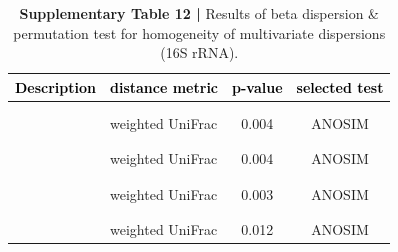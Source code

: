 \documentclass[
  10pt,
  letterpaper,
  DIV=11,
  numbers=noendperiod]{scrartcl}
\begin{document}
\begin{table}[H]

\caption{\textbf{Supplementary Table 12 |} Results of beta dispersion \& permutation test for homogeneity of multivariate dispersions (16S rRNA).}
\centering
\fontsize{8}{10}\selectfont
\begin{tabular}[t]{llcc}
\toprule
\textcolor{black}{\textbf{Description}} & \textcolor{black}{\textbf{distance metric}} & \textcolor{black}{\textbf{p-value}} & \textcolor{black}{\textbf{selected test}}\\
\midrule
\addlinespace[-0.3em]
\multicolumn{4}{l}{\textbf{}}\\
\hspace{1em}\cellcolor{gray!6}{FULL data set} & \cellcolor{gray!6}{unweighted UniFrac} & \cellcolor{gray!6}{0.013} & \cellcolor{gray!6}{ANOSIM}\\
\hspace{1em} & weighted UniFrac & 0.004 & \vphantom{1} ANOSIM\\
\addlinespace[-0.3em]
\multicolumn{4}{l}{\textbf{}}\\
\hspace{1em}\cellcolor{gray!6}{Arbitrary filter} & \cellcolor{gray!6}{unweighted UniFrac} & \cellcolor{gray!6}{0.002} & \cellcolor{gray!6}{ANOSIM}\\
\hspace{1em} & weighted UniFrac & 0.004 & ANOSIM\\
\addlinespace[-0.3em]
\multicolumn{4}{l}{\textbf{}}\\
\hspace{1em}\cellcolor{gray!6}{PERFect filter} & \cellcolor{gray!6}{unweighted UniFrac} & \cellcolor{gray!6}{0.001} & \cellcolor{gray!6}{ANOSIM}\\
\hspace{1em} & weighted UniFrac & 0.003 & ANOSIM\\
\addlinespace[-0.3em]
\multicolumn{4}{l}{\textbf{}}\\
\hspace{1em}\cellcolor{gray!6}{PIME filter} & \cellcolor{gray!6}{unweighted UniFrac} & \cellcolor{gray!6}{0.474} & \cellcolor{gray!6}{ADONIS}\\
\hspace{1em} & weighted UniFrac & 0.012 & ANOSIM\\
\bottomrule
\end{tabular}
\end{table}
\end{document}
